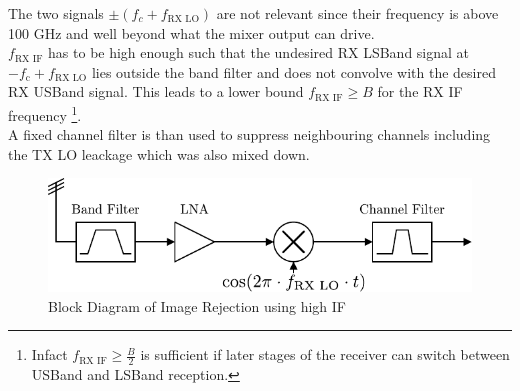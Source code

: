 The two signals $\pm (f_{c} + f_{\text{RX LO}})$ are not relevant since their
frequency is above 100 GHz and well beyond what the mixer output can drive. \\

$f_{\text{RX IF}}$ has to be high enough such that the undesired
\gls{RX} \gls{LSBand} signal at $-f_{\text{c}} + f_{\text{RX LO}}$
lies outside the band filter and does not convolve with the desired
\gls{RX} \gls{USBand} signal. This leads to a lower bound
$f_{\text{RX IF}} \geq B$ for the \gls{RX} \gls{IF} frequency
\footnote{%
  Infact $f_{\text{RX IF}} \geq \frac{B}{2}$
  is sufficient if later stages of the receiver can switch
  between \gls{USBand} and \gls{LSBand} reception.}. \\

A fixed channel filter is than used to suppress neighbouring channels
including the \gls{TX} \gls{LO} leackage which was also mixed down. \\

\begin{figure}[h!]
  \centering
  \includegraphics[width=\textwidth]{figures/rx_rf_0_bd}
  \caption{Block Diagram of Image Rejection using high \gls{IF}}
  \label{fig:rx_rf_0_bd}
\end{figure}

